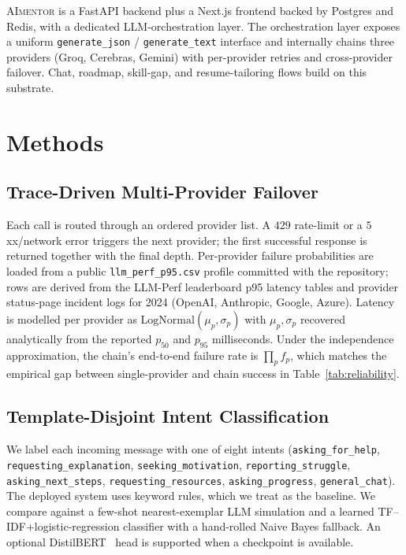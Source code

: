 \documentclass[conference]{IEEEtran}
\begin{document}
\textsc{AImentor} is a FastAPI backend plus a Next.js frontend backed by
Postgres and Redis, with a dedicated LLM-orchestration layer. The
orchestration layer exposes a uniform \texttt{generate\_json} /
\texttt{generate\_text} interface and internally chains three providers
(Groq, Cerebras, Gemini) with per-provider retries and cross-provider
failover. Chat, roadmap, skill-gap, and resume-tailoring flows build on
this substrate.

\section{Methods}\label{sec:methods}

\subsection{Trace-Driven Multi-Provider Failover}\label{sec:methods:failover}
Each call is routed through an ordered provider list. A $429$
rate-limit or a $5$xx/network error triggers the next provider; the
first successful response is returned together with the final depth.
Per-provider failure probabilities are loaded from a public
\texttt{llm\_perf\_p95.csv} profile committed with the repository; rows
are derived from the LLM-Perf leaderboard p95 latency tables and
provider status-page incident logs for 2024 (OpenAI, Anthropic, Google,
Azure). Latency is modelled per provider as
$\mathrm{LogNormal}(\mu_p, \sigma_p)$ with $\mu_p,\sigma_p$ recovered
analytically from the reported $p_{50}$ and $p_{95}$
milliseconds. Under the independence approximation, the chain's
end-to-end failure rate is $\prod_p f_p$, which matches the empirical
gap between single-provider and chain success in
Table~\ref{tab:reliability}.

\subsection{Template-Disjoint Intent Classification}\label{sec:methods:intent}
We label each incoming message with one of eight intents
(\texttt{asking\_for\_help}, \texttt{requesting\_explanation},
\texttt{seeking\_motivation}, \texttt{reporting\_struggle},
\texttt{asking\_next\_steps}, \texttt{requesting\_resources},
\texttt{asking\_progress}, \texttt{general\_chat}). The deployed system
uses keyword rules, which we treat as the baseline. We compare against a
few-shot nearest-exemplar LLM simulation and a learned
TF--IDF$+$logistic-regression classifier with a hand-rolled Naive Bayes
fallback. An optional DistilBERT~\cite{sanh2019distilbert} head is
supported when a checkpoint is available.
\end{document}
